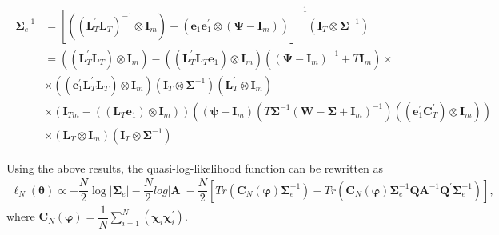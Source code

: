 \documentclass[12pt,a4paper,hyperref]{article}
\begin{document}
\begin{align}
\begin{split}
\boldsymbol{\Sigma}^{-1}_{e} &=\left[ \left( \left( \boldsymbol{L}^{'}_{T}\boldsymbol{L}_{T}   \right)^{-1} \otimes \boldsymbol{I}_{m} \right)+\left(  \boldsymbol{e}_{1}\boldsymbol{e}^{'}_{1} \otimes (\boldsymbol{\Psi}-\boldsymbol{I}_{m}) \right)    \right]^{-1} \left( \boldsymbol{I}_{T}\otimes \boldsymbol{\Sigma}^{-1}  \right) \\
&=\left( (\boldsymbol{L}^{'}_{T}\boldsymbol{L}_{T} )\otimes \boldsymbol{I}_{m}   \right)- \left( (\boldsymbol{L}^{'}_{T}\boldsymbol{L}_{T}\boldsymbol{e}_{1} )\otimes \boldsymbol{I}_{m}  \right) \left( (\boldsymbol{\Psi}-\boldsymbol{I}_{m} )^{-1}+T \boldsymbol{I}_{m}  \right)\times \\
&\times \left( (\boldsymbol{e}^{'}_{1}\boldsymbol{L}^{'}_{T}\boldsymbol{L}_{T} )\otimes \boldsymbol{I}_{m}  \right) \left( \boldsymbol{I}_{T} \otimes \boldsymbol{\Sigma}^{-1} \right)
\left(\boldsymbol{L}^{'}_{T} \otimes \boldsymbol{I}_{m}  \right) \\
& \times \left(\boldsymbol{I}_{Tm}- \left((\boldsymbol{L}_{T}\boldsymbol{e}_{1})\otimes \boldsymbol{I}_{m}\right) \right) \left( (\boldsymbol{\psi}-\boldsymbol{I}_{m})\left(T\boldsymbol{\Sigma}^{-1}(\boldsymbol{W}-\boldsymbol{\Sigma}+\boldsymbol{I}_{m} )^{-1}  \right) \left( (\boldsymbol{e}^{'}_{1} \boldsymbol{C}^{'}_{T} )\otimes \boldsymbol{I}_{m}  \right)   \right)    \\
 &\times \left( \boldsymbol{L}_{T}\otimes \boldsymbol{I}_{m}  \right) \left( \boldsymbol{I}_{T}\otimes \boldsymbol{\Sigma}^{-1} \right)
\end{split}
\end{align}



Using the above results, the quasi-log-likelihood function can be rewritten as
\begin{align}
\ell_{N} ( \boldsymbol{\theta})\propto  -\dfrac{N}{2}\log\vert \boldsymbol{\Sigma}_{e} \vert-\dfrac{N}{2} log\vert \boldsymbol{A} \vert-
\dfrac{N}{2} \left[Tr\left(\boldsymbol{C}_{N}(\boldsymbol{\varphi})\boldsymbol{\Sigma}_{e}^{-1}\right)- Tr \left( \boldsymbol{C}_{N}(\boldsymbol{\varphi})\boldsymbol{\Sigma}_{e}^{-1}\boldsymbol{Q}\boldsymbol{A}^{-1}\boldsymbol{Q}^{'}\boldsymbol{\Sigma}_{e}^{-1} \right)   \right], \label{21}
\end{align}
where $\boldsymbol{C}_{N}(\boldsymbol{\varphi})=\dfrac{1}{N}\sum^{N}_{i=1}\left( \boldsymbol{\chi}_{i}\boldsymbol{\chi}^{'}_{i}\right)$.
\end{document}
